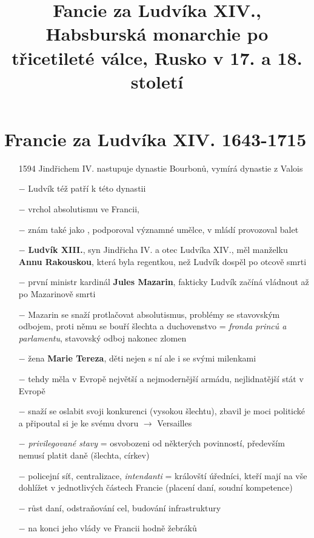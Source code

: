 \documentclass{article}
\title{\vspace{-2cm}Fancie za Ludvíka XIV., Habsburská monarchie po třicetileté válce, Rusko v 17. a 18. století\vspace{-1.7cm}}
\date{}
\author{}
\begin{document}
\maketitle

\section*{Francie za Ludvíka XIV. 1643-1715}

\begin{itemize}
    \vspace{-0.5em}
    \setlength\itemsep{0.15em}
    \item[1594] Jindřichem IV. nastupuje dynastie Bourbonů, vymírá dynastie z Valois
    \item[$-$] Ludvík též patří k této dynastii
    \item[$-$] vrchol absolutismu ve Francii, 
    \item[$-$] znám také jako , podporoval významné umělce, v mládí provozoval balet
    \item[$-$] \textbf{Ludvík XIII.}, syn Jindřicha IV. a otec Ludvíka XIV., měl manželku \textbf{Annu Rakouskou}, která byla regentkou, než Ludvík dospěl po otcově smrti
    \item[$-$] první ministr kardinál \textbf{Jules Mazarin}, fakticky Ludvík začíná vládnout až po Mazarinově smrti
    \item[$-$] Mazarin se snaží protlačovat absolutismus, problémy se stavovským odbojem, proti němu se bouří šlechta a duchovenstvo = \textit{fronda princů a parlamentu}, stavovský odboj nakonec zlomen
    \item[$-$] žena \textbf{Marie Tereza}, děti nejen s ní ale i se svými milenkami
    \item[$-$] tehdy měla v Evropě největší a nejmodernější armádu, nejlidnatější stát v Evropě
    \item[$-$] snaží se oslabit svoji konkurenci (vysokou šlechtu), zbavil je moci politické a připoutal si je ke svému dvoru $\rightarrow$ Versailles
    \item[$-$] \textit{privilegované stavy} = osvobozeni od některých povinností, především nemusí platit daně (šlechta, církev)
    \item[$-$] policejní síť, centralizace, \textit{intendanti} = královští úředníci, kteří mají na vše dohlížet v jednotlivých částech Francie (placení daní, soudní kompetence)
    \item[$-$] růst daní, odstraňování cel, budování infrastruktury
    \item[$-$] na konci jeho vlády ve Francii hodně žebráků
\end{itemize}
\end{document}

